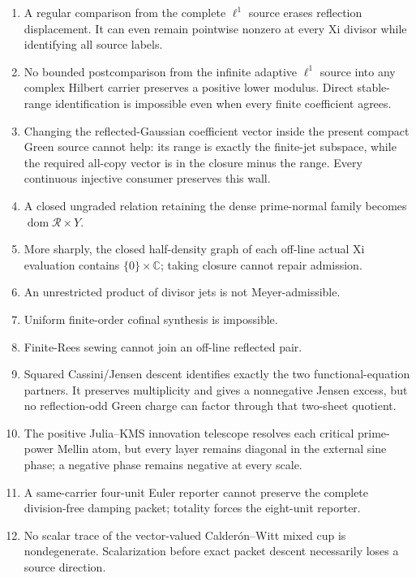\documentclass[11pt]{article}
\theoremstyle{definition}
\theoremstyle{remark}
\newcommand{\C}{\mathbb C}
\newcommand{\cR}{\mathcal R}
\newcommand{\dom}{\operatorname{dom}}
\begin{document}
\begin{enumerate}[leftmargin=2.2em]
\item A regular comparison from the complete \(\ell^1\) source erases
      reflection displacement.  It can even remain pointwise nonzero at
      every Xi divisor while identifying all source labels.
\item No bounded postcomparison from the infinite adaptive \(\ell^1\)
      source into any complex Hilbert carrier preserves a positive lower
      modulus.  Direct stable-range identification is impossible even when
      every finite coefficient agrees.
\item Changing the reflected-Gaussian coefficient vector inside the present
      compact Green source cannot help: its range is exactly the finite-jet
      subspace, while the required all-copy vector is in the closure minus
      the range.  Every continuous injective consumer preserves this wall.
\item A closed ungraded relation retaining the dense prime-normal family
      becomes \(\dom\cR\times Y\).
\item More sharply, the closed half-density graph of each off-line actual
      Xi evaluation contains \(\{0\}\times\C\); taking closure cannot repair
      admission.
\item An unrestricted product of divisor jets is not Meyer-admissible.
\item Uniform finite-order cofinal synthesis is impossible.
\item Finite-Rees sewing cannot join an off-line reflected pair.
\item Squared Cassini/Jensen descent identifies exactly the two
      functional-equation partners.  It preserves multiplicity and gives a
      nonnegative Jensen excess, but no reflection-odd Green charge can
      factor through that two-sheet quotient.
\item The positive Julia--KMS innovation telescope resolves each critical
      prime-power Mellin atom, but every layer remains diagonal in the
      external sine phase; a negative phase remains negative at every scale.
\item A same-carrier four-unit Euler reporter cannot preserve the complete
      division-free damping packet; totality forces the eight-unit reporter.
\item No scalar trace of the vector-valued Calder\'on--Witt mixed cup is
      nondegenerate.  Scalarization before exact packet descent necessarily
      loses a source direction.

\end{enumerate}
\end{document}
